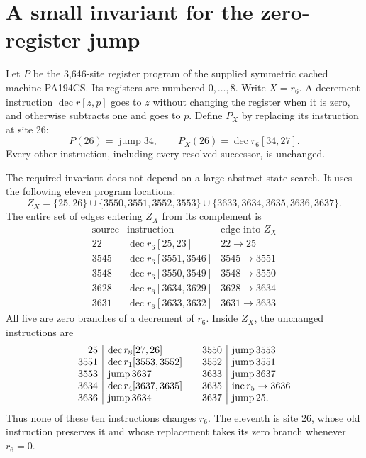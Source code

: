 \section{A small invariant for the zero-register jump}
\label{sec:zero-cut}

Let $P$ be the 3,646-site register program of the supplied symmetric cached
machine PA194CS. Its registers are numbered $0,\ldots,8$. Write $X=r_6$.
A decrement instruction $\operatorname{dec}r[z,p]$ goes to $z$ without
changing the register when it is zero, and otherwise subtracts one and
goes to $p$. Define $P_X$ by replacing its instruction at site 26:
\[
 P(26)=\operatorname{jump}34,
 \qquad
 P_X(26)=\operatorname{dec}r_6[34,27].
\]
Every other instruction, including every resolved successor, is unchanged.

The required invariant does not depend on a large abstract-state search.
It uses the following eleven program locations:
\[
 Z_X=\{25,26\}\cup\{3550,3551,3552,3553\}
       \cup\{3633,3634,3635,3636,3637\}.
\]
The entire set of edges entering $Z_X$ from its complement is
\[
\begin{array}{c|c|c}
\text{source}&\text{instruction}&\text{edge into }Z_X\\\hline
22&\operatorname{dec}r_6[25,23]&22\longrightarrow25\\
3545&\operatorname{dec}r_6[3551,3546]&3545\longrightarrow3551\\
3548&\operatorname{dec}r_6[3550,3549]&3548\longrightarrow3550\\
3628&\operatorname{dec}r_6[3634,3629]&3628\longrightarrow3634\\
3631&\operatorname{dec}r_6[3633,3632]&3631\longrightarrow3633
\end{array}
\]
All five are zero branches of a decrement of $r_6$. Inside $Z_X$, the
unchanged instructions are
\[
\begin{array}{r|l@{\qquad}r|l}
25&\operatorname{dec}r_8[27,26]&3550&\operatorname{jump}3553\\
3551&\operatorname{dec}r_1[3553,3552]&3552&\operatorname{jump}3551\\
3553&\operatorname{jump}3637&3633&\operatorname{jump}3637\\
3634&\operatorname{dec}r_4[3637,3635]&3635&\operatorname{inc}r_5\to3636\\
3636&\operatorname{jump}3634&3637&\operatorname{jump}25.
\end{array}
\]
Thus none of these ten instructions changes $r_6$. The eleventh is site
26, whose old instruction preserves it and whose replacement takes its
zero branch whenever $r_6=0$.

